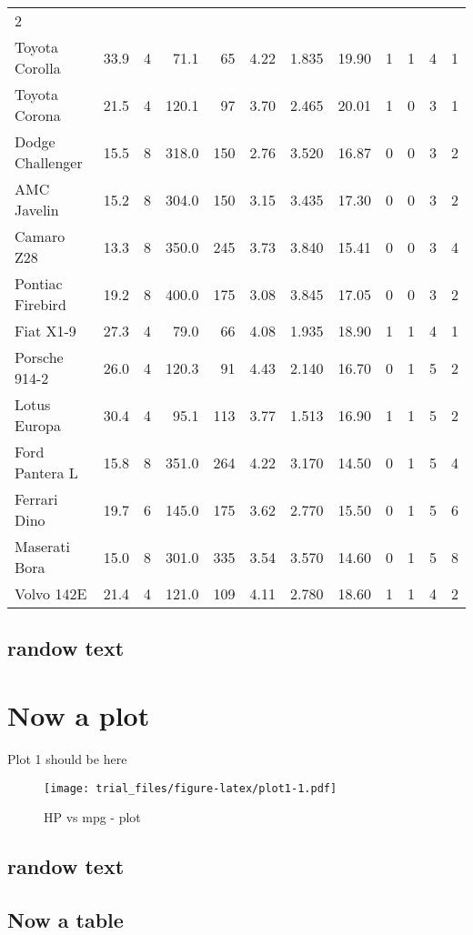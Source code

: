 \documentclass[]{article}
\begin{document}
\begin{longtable}[]{@{}lrrrrrrrrrrr@{}}
2\tabularnewline
Toyota Corolla & 33.9 & 4 & 71.1 & 65 & 4.22 & 1.835 & 19.90 & 1 & 1 & 4
& 1\tabularnewline
Toyota Corona & 21.5 & 4 & 120.1 & 97 & 3.70 & 2.465 & 20.01 & 1 & 0 & 3
& 1\tabularnewline
Dodge Challenger & 15.5 & 8 & 318.0 & 150 & 2.76 & 3.520 & 16.87 & 0 & 0
& 3 & 2\tabularnewline
AMC Javelin & 15.2 & 8 & 304.0 & 150 & 3.15 & 3.435 & 17.30 & 0 & 0 & 3
& 2\tabularnewline
Camaro Z28 & 13.3 & 8 & 350.0 & 245 & 3.73 & 3.840 & 15.41 & 0 & 0 & 3 &
4\tabularnewline
Pontiac Firebird & 19.2 & 8 & 400.0 & 175 & 3.08 & 3.845 & 17.05 & 0 & 0
& 3 & 2\tabularnewline
Fiat X1-9 & 27.3 & 4 & 79.0 & 66 & 4.08 & 1.935 & 18.90 & 1 & 1 & 4 &
1\tabularnewline
Porsche 914-2 & 26.0 & 4 & 120.3 & 91 & 4.43 & 2.140 & 16.70 & 0 & 1 & 5
& 2\tabularnewline
Lotus Europa & 30.4 & 4 & 95.1 & 113 & 3.77 & 1.513 & 16.90 & 1 & 1 & 5
& 2\tabularnewline
Ford Pantera L & 15.8 & 8 & 351.0 & 264 & 4.22 & 3.170 & 14.50 & 0 & 1 &
5 & 4\tabularnewline
Ferrari Dino & 19.7 & 6 & 145.0 & 175 & 3.62 & 2.770 & 15.50 & 0 & 1 & 5
& 6\tabularnewline
Maserati Bora & 15.0 & 8 & 301.0 & 335 & 3.54 & 3.570 & 14.60 & 0 & 1 &
5 & 8\tabularnewline
Volvo 142E & 21.4 & 4 & 121.0 & 109 & 4.11 & 2.780 & 18.60 & 1 & 1 & 4 &
2\tabularnewline
\bottomrule
\end{longtable}

\subsection{randow text}\label{randow-text}

\lipsum

\section{Now a plot}\label{now-a-plot}

Plot 1 should be here

\begin{figure}[htbp]
\centering
\texttt{[image: trial\_files/figure-latex/plot1-1.pdf]}
\caption{HP vs mpg - plot}
\end{figure}

\subsection{randow text}\label{randow-text-1}

\lipsum

\subsection{Now a table}\label{now-a-table}
\end{document}

